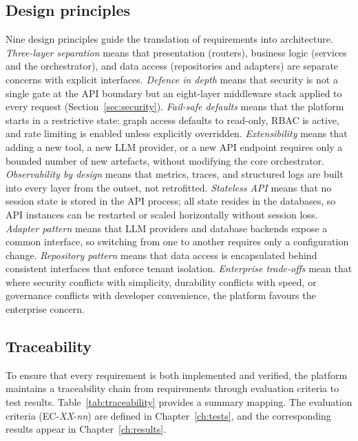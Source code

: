 \documentclass[a4paper]{sapthesis}
\begin{document}
\subsection{Design principles}

Nine design principles guide the translation of requirements into
architecture.  \emph{Three-layer separation} means that presentation
(routers), business logic (services and the orchestrator), and data access
(repositories and adapters) are separate concerns with explicit interfaces.
\emph{Defence in depth} means that security is not a single gate at the API
boundary but an eight-layer middleware stack applied to every request
(Section~\ref{sec:security}).  \emph{Fail-safe defaults} means that the
platform starts in a restrictive state: graph access defaults to read-only, RBAC is
active, and rate limiting is enabled unless explicitly overridden.
\emph{Extensibility} means that adding a new tool, a new LLM provider, or
a new API endpoint requires only a bounded number of new artefacts, without
modifying the core orchestrator.  \emph{Observability by design} means that
metrics, traces, and structured logs are built into every layer from the
outset, not retrofitted.  \emph{Stateless API} means that no session state
is stored in the API process; all state resides in the databases, so API
instances can be restarted or scaled horizontally without session loss.
\emph{Adapter pattern} means that LLM providers and database backends
expose a common interface, so switching from one to another requires only a
configuration change.  \emph{Repository pattern} means that data access is
encapsulated behind consistent interfaces that enforce tenant isolation.
\emph{Enterprise trade-offs} mean that where security conflicts with
simplicity, durability conflicts with speed, or governance conflicts with
developer convenience, the platform favours the enterprise concern.

\subsection{Traceability}

To ensure that every requirement is both implemented and verified, the
platform maintains a traceability chain from requirements through
evaluation criteria to test results.  Table~\ref{tab:traceability} provides
a summary mapping.  The evaluation criteria (EC-\emph{XX}-\emph{nn}) are
defined in Chapter~\ref{ch:tests}, and the corresponding results appear in
Chapter~\ref{ch:results}.
\end{document}
